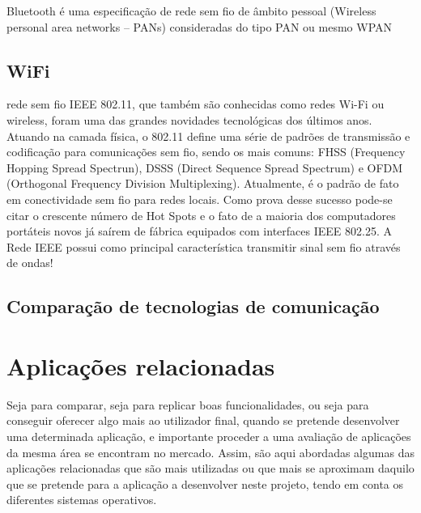 Bluetooth é uma especificação de rede sem fio de âmbito pessoal (Wireless personal area networks – PANs) consideradas do tipo PAN ou mesmo WPAN


\subsection{WiFi}

rede sem fio IEEE 802.11, que também são conhecidas como redes Wi-Fi ou wireless, foram uma das grandes novidades tecnológicas dos últimos anos. Atuando na camada física, o 802.11 define uma série de padrões de transmissão e codificação para comunicações sem fio, sendo os mais comuns: FHSS (Frequency Hopping Spread Spectrun), DSSS (Direct Sequence Spread Spectrum) e OFDM (Orthogonal Frequency Division Multiplexing). Atualmente, é o padrão de fato em conectividade sem fio para redes locais. Como prova desse sucesso pode-se citar o crescente número de Hot Spots e o fato de a maioria dos computadores portáteis novos já saírem de fábrica equipados com interfaces IEEE 802.25. A Rede IEEE possui como principal característica transmitir sinal sem fio através de ondas!




\subsection{Comparação de tecnologias de comunicação}












\newpage
\section{Aplicações relacionadas}



Seja para comparar, seja para replicar boas funcionalidades, ou seja para conseguir oferecer algo mais ao utilizador final, quando se pretende desenvolver uma determinada aplicação, e
importante proceder a uma avaliação de aplicações da mesma área se encontram no mercado.
Assim, são aqui abordadas algumas das aplicações relacionadas que são mais utilizadas ou que mais se aproximam daquilo que se pretende para a aplicação a desenvolver neste projeto,
tendo em conta os diferentes sistemas operativos.



